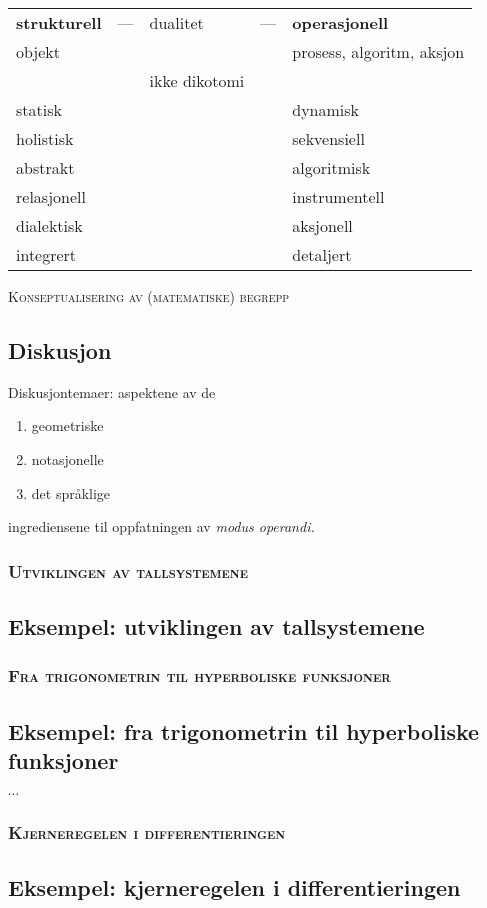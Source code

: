\documentclass[xcolor=x11names,compress]{beamer}
\renewcommand{\(}{\begin{columns}}
\renewcommand{\)}{\end{columns}}
\newcommand{\<}[1]{\begin{column}{#1}}
\renewcommand{\>}{\end{column}}
\begin{document}
 \begin{frame}
\begin{table}[]
\centering
\label{my-label}
\begin{tabular}{lllll}
{\bf strukturell} & --- & dualitet & --- & {\bf operasjonell }\\
objekt    &  &  &  & prosess, algoritm, aksjon   \\
            &  &ikke dikotomi  &  &               \\
            
  statisk          &  &  &  &  dynamisk            \\
  holistisk & &  & & sekvensiell \\
abstrakt & & & & algoritmisk \\
relasjonell & & & & instrumentell \\
dialektisk & & & & aksjonell \\
integrert & & & & detaljert
\end{tabular}
\end{table}
\centering
{\scshape Konseptualisering av (matematiske) begrepp}
\end{frame}
%
%
\begin{frame}
    \subsection{Diskusjon}
   Diskusjontemaer: aspektene av de
   \begin{enumerate}
   \item geometriske
   \item notasjonelle
   \item det språklige
   \end{enumerate}   
   ingrediensene til oppfatningen av {\it modus operandi.}
\end{frame}
%
%
\begin{frame}
   \frametitle{\scshape Utviklingen av tallsystemene }
    \subsection{Eksempel: utviklingen av tallsystemene}
      
\end{frame}
%
\begin{frame}
   \frametitle{\scshape  Fra trigonometrin til hyperboliske funksjoner }
    \subsection{Eksempel: fra trigonometrin til hyperboliske funksjoner}
      $\cdots$
\end{frame}
%
%
\begin{frame}
  \frametitle{\scshape   Kjerneregelen i differentieringen}
    \subsection{Eksempel: kjerneregelen i differentieringen}
       
\end{frame}
%
\end{document}
